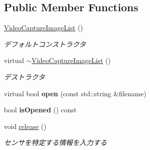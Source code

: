 \subsection*{Public Member Functions}
\begin{DoxyCompactItemize}
\item 
\hypertarget{classskl_1_1_video_capture_image_list_a01adf7ae192e5c22ee43ff011f61aecb}{}\label{classskl_1_1_video_capture_image_list_a01adf7ae192e5c22ee43ff011f61aecb} 
\hyperlink{classskl_1_1_video_capture_image_list_a01adf7ae192e5c22ee43ff011f61aecb}{Video\+Capture\+Image\+List} ()
\begin{DoxyCompactList}\small\item\em デフォルトコンストラクタ \end{DoxyCompactList}\item 
\hypertarget{classskl_1_1_video_capture_image_list_afbd4271704c52c53c0044afc9554260e}{}\label{classskl_1_1_video_capture_image_list_afbd4271704c52c53c0044afc9554260e} 
virtual \hyperlink{classskl_1_1_video_capture_image_list_afbd4271704c52c53c0044afc9554260e}{$\sim$\+Video\+Capture\+Image\+List} ()
\begin{DoxyCompactList}\small\item\em デストラクタ \end{DoxyCompactList}\item 
\hypertarget{classskl_1_1_video_capture_image_list_ac2ee0961a1620389d30e367251cbc6fd}{}\label{classskl_1_1_video_capture_image_list_ac2ee0961a1620389d30e367251cbc6fd} 
virtual bool {\bfseries open} (const std\+::string \&filename)
\item 
\hypertarget{classskl_1_1_video_capture_image_list_a6ac572e50288fa2c48c6d48026124f46}{}\label{classskl_1_1_video_capture_image_list_a6ac572e50288fa2c48c6d48026124f46} 
bool {\bfseries is\+Opened} () const
\item 
\hypertarget{classskl_1_1_video_capture_image_list_aa341c3148f8cd67c152d8d24dc1c7a09}{}\label{classskl_1_1_video_capture_image_list_aa341c3148f8cd67c152d8d24dc1c7a09} 
void \hyperlink{classskl_1_1_video_capture_image_list_aa341c3148f8cd67c152d8d24dc1c7a09}{release} ()
\begin{DoxyCompactList}\small\item\em センサを特定する情報を入力する \end{DoxyCompactList}\item 
\hypertarget{classskl_1_1_video_capture_image_list_a6598af40f62a9088ee423aa966b77c09}{}\label{classskl_1_1_video_capture_image_list_a6598af40f62a9088ee423aa966b77c09} 

\end{DoxyCompactItemize}
